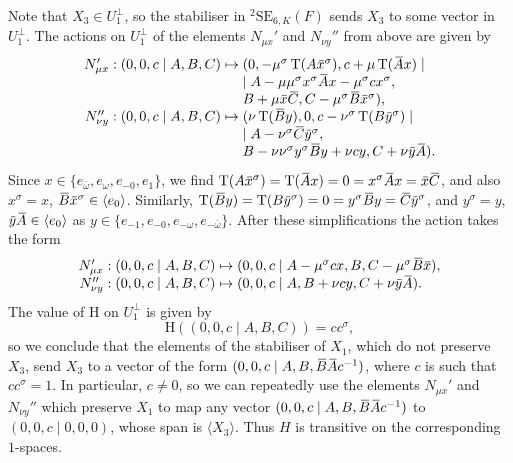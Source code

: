 \documentclass{amsart}
\def\ovA{\mathord{\mbox{\hspace*{0pt}}\,\overline{\!A\!\!\;}\!\:}\mbox{\hspace*{0pt}}}
\def\ovB{\mathord{\mbox{\hspace*{0pt}}\,\overline{\!B\!\!\;}\!\:}\mbox{\hspace*{0pt}}}
\def\ovC{\mathord{\mbox{\hspace*{0pt}}\,\overline{\!C\!\!\;}\!\:}\mbox{\hspace*{0pt}}}
\def\ovx{\mathord{\mbox{\hspace*{0pt}}\,\overline{\!x\!\!\;}\!\:}\mbox{\hspace*{0pt}}}
\def\ovy{\mathord{\mbox{\hspace*{0pt}}\,\overline{\!y\!\!\;}\!\:}\mbox{\hspace*{0pt}}}
\newcommand{\SE}{\mathrm{SE}}
\newcommand{\Tr}{\operatorname{T}}
\renewcommand{\bar}{\overline}
\renewcommand{\H}{\mathrm{H}}
\newcommand{\s}{\sigma}
\theoremstyle{plain}
\numberwithin{theorem}{section}
\theoremstyle{definition}
\begin{document}
Note that $X_3 \in U_1^{\perp}$, so the stabiliser in 
${}^2\SE_{6,K}(F)$ sends $X_3$ to some vector
in $U_1^{\perp}$. 
The actions on $U_1^{\perp}$ of the elements $N_{\mu x}'$ and $N_{\nu y}''$ from above are given
by
\begin{equation}
	\begin{array}{r@{\;}c@{\;}l}
		N_{\mu x}' : (0,0,c\mid A,B,C) & \mapsto & 
			(0,-\mu^{\s}\Tr(A\ovx^{\s}), c+\mu\Tr(\ovA x) \mid \\
		& & \mid A - \mu\mu^{\s} x^{\s} \ovA x - \mu^{\s} c x^{\s}, \\
		& &		 B + \mu\ovx\ovC, C - \mu^{\s} \ovB \ovx^{\s}), \\
				 
		N_{\nu y}'' : (0,0,c\mid A,B,C) & \mapsto & 
			(\nu\Tr(\ovB y), 0, c-\nu^{\s}\Tr(B\ovy^{\s}) \mid \\
		& & \mid A - \nu^{\s}\ovC\ovy^{\s}, \\
		& & B - \nu\nu^{\s} y^{\s}\ovB y + \nu c y, C + \nu\ovy\ovA). 
	\end{array}
\end{equation}
Since $x \in \{e_{\bar{\omega}}, e_{\omega}, e_{-0}, e_1\}$, we find $\Tr(A\ovx^{\s}) = 
\Tr(\ovA x) = 0 = x^{\s} \ovA x = \ovx \ovC$, and also $x^{\s} = x$, $\ovB \ovx^{\s} \in 
\langle e_0 \rangle$. Similarly, $\Tr(\ovB y) = \Tr(B\ovy^{\s}) = 0 = y^{\s} \ovB y = \ovC \ovy^{\s}$,
and $y^{\s} = y$, $\ovy \ovA \in \langle e_0 \rangle$ as $y \in \{ e_{-1}, e_{-0}, e_{-\omega}, 
e_{-\bar{\omega}} \}$. After these simplifications the action takes the form
\begin{equation}
	\begin{array}{r@{\;}c@{\;}l}
		N_{\mu x}' : (0,0,c\mid A,B,C) & \mapsto &
			(0,0,c\mid A  - \mu^{\s} c x, B, C - \mu^{\s}\ovB\ovx ), \\
		
		N_{\nu y}'' : (0,0,c\mid A,B,C) & \mapsto &
			(0,0,c\mid A, B + \nu c y, C + \nu \ovy \ovA).
	\end{array}
\end{equation}
The value of $\H$ on $U_1^{\perp}$ is given by
\begin{equation}
	\H((0,0,c\mid A,B,C)) = c c^{\s},
\end{equation}
so we conclude that the elements of the stabiliser of $X_1$, 
which do not preserve $X_3$, 
send $X_3$ to a vector of the form $(0,0,c\mid A,B, \ovB \ovA 
c^{-1})$, where $c$ is such that $c c^{\s} = 1$. In particular,
$c \neq 0$, so we can repeatedly use the elements $N_{\mu x}'$
and $N_{\nu y}''$ which preserve $X_1$ to map any vector
$(0,0,c\mid A,B, \ovB \ovA c^{-1})$ to $(0,0,c \mid 0,0,0)$,
whose span is $\langle X_3\rangle$.  Thus $H$ is transitive on the
corresponding $1$-spaces.
\end{document}
